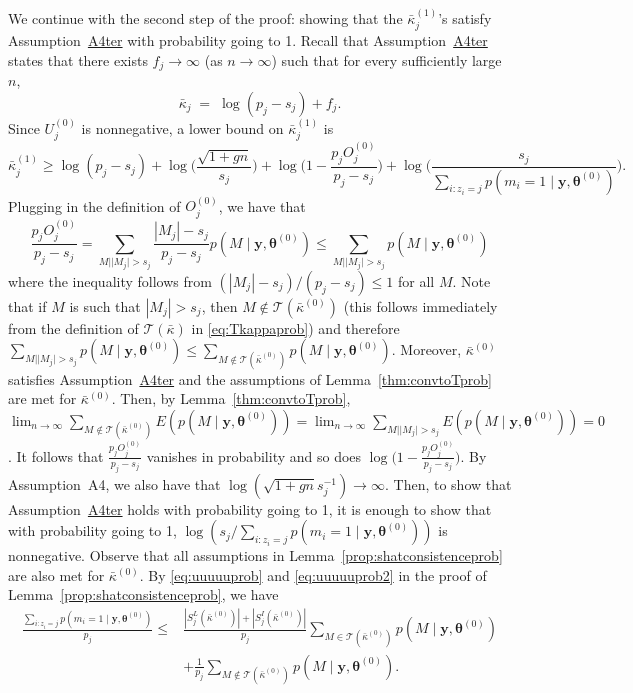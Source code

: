 \documentclass[
  12pt]{article}
\newcommand{\T}{\mathcal{T}}
\newcommand{\by}{\mathbf{y}}
\newcommand{\btheta}{\boldsymbol{\theta}}
\begin{document}
We continue with the second step of the proof: showing that the $\bar{\kappa}^{(1)}_j$'s satisfy Assumption~\hyperlink{lab:A4ter}{A4ter} with probability going to 1. Recall that Assumption~\hyperlink{lab:A4ter}{A4ter} states that there exists $f_j\to \infty$ (as $n\to \infty$) such that for every sufficiently large $n$,
\begin{equation*}
    \bar{\kappa}_j \;=\;\log(p_j-s_j) + f_j.
\end{equation*}
Since $U_j^{(0)}$ is nonnegative, a lower bound on $\bar{\kappa}^{(1)}_j$ is %
\begin{equation*}\label{eq:decompstep2pen2prob}
    \bar{\kappa}^{(1)}_j
    \geq  \log(p_j-s_j)+\log\Big(\frac{\sqrt{1+gn}}{s_j}\Big)+\log\Bigg(1-\frac{p_j O^{(0)}_j}{p_j-s_j}\Bigg)+\log\Bigg(\frac{s_j}{\sum_{i:z_i=j}p(m_i=1 \mid \by, \btheta^{(0)}) }\Bigg).
\end{equation*}
Plugging in the definition of $O^{(0)}_j$, we have that
$$\frac{p_j O^{(0)}_j}{p_j-s_j} =  \sum_{M  | |M_j| > s_j}\frac{|M_j|-s_j}{p_j-s_j}p(M\mid \by, \btheta^{(0)})\leq \sum_{M  | |M_j| > s_j}p(M\mid \by, \btheta^{(0)})$$
where the inequality follows from $(|M_j|-s_j)/(p_j-s_j)\leq 1$ for all $M$.
Note that if $M$ is such that $|M_j|>s_j$, then $M\not\in\T(\bar{\kappa}^{(0)})$ (this follows immediately from the definition of $\T(\bar{\kappa})$ in \eqref{eq:Tkappaprob})  and therefore $\sum_{M  | |M_j| > s_j}p(M\mid \by, \btheta^{(0)})\leq \sum_{M  \not \in \T(\bar{\kappa}^{(0)})}p(M\mid \by, \btheta^{(0)})$. Moreover, $\bar{\kappa}^{(0)}$ satisfies Assumption~\hyperlink{lab:A4ter}{A4ter} and the assumptions of Lemma~\ref{thm:convtoTprob} are met for $\bar{\kappa}^{(0)}$.
Then, by Lemma~\ref{thm:convtoTprob}, $\lim_{n\to\infty} \sum_{M \not\in \T(\bar{\kappa}^{(0)})}E(p(M\mid \by, \btheta^{(0)}))=\lim_{n\to\infty}\sum_{M  | |M_j| > s_j}E(p(M\mid \by, \btheta^{(0)})) = 0$. It follows that $\frac{p_j O^{(0)}_j}{p_j-s_j}$ vanishes in probability and so does $\log\Big(1-\frac{p_j O^{(0)}_j}{p_j-s_j}\Big)$. By Assumption~A4, we also have that $\log(\sqrt{1+gn}s_j^{-1})\to\infty$. 
Then, to show that Assumption~\hyperlink{lab:A4ter}{A4ter} holds with probability going to 1, it is enough to show that with probability going to 1, $\log(s_j/\sum_{i:z_i=j}p(m_i=1 \mid \by, \btheta^{(0)}) )$ is nonnegative. Observe that all assumptions in Lemma~\ref{prop:shatconsistenceprob} are also met for $\bar{\kappa}^{(0)}$. By \eqref{eq:uuuuuprob} and \eqref{eq:uuuuuprob2} in the proof of Lemma~\ref{prop:shatconsistenceprob}, we have
\begin{align*}
    \frac{\sum_{i:z_i=j}p(m_i=1 \mid \by, \btheta^{(0)}) }{p_j}
    \leq & \frac{|S^{L}_j(\bar{\kappa}^{(0)})|+|S^{I}_j(\bar{\kappa}^{(0)})|}{p_j}\sum_{M \in \T(\bar{\kappa}^{(0)})}p(M\mid \by, \btheta^{(0)}) \\
    &+ \frac{1}{p_j} \sum_{M \not\in \T(\bar{\kappa}^{(0)})}p(M\mid \by, \btheta^{(0)}).
\end{align*}
\end{document}
